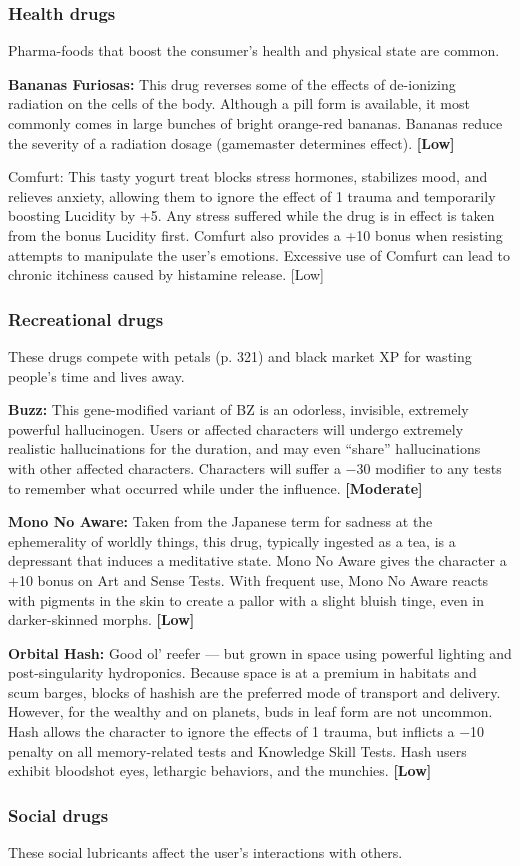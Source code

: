 \subsubsection{Health drugs} 

Pharma-foods that boost the consumer’s health and physical state are common. 

\textbf{Bananas Furiosas:} This drug reverses some of the effects of de-ionizing radiation on the cells of the body. Although a pill form is available, it most commonly comes in large bunches of bright orange-red bananas. Bananas reduce the severity of a radiation dosage (gamemaster determines effect). \textbf{[Low]} 

Comfurt: This tasty yogurt treat blocks stress hormones, stabilizes mood, and relieves anxiety, allowing them to ignore the effect of 1 trauma and temporarily boosting Lucidity by +5. Any stress suffered while the drug is in effect is taken from the bonus Lucidity first. Comfurt also provides a +10 bonus when resisting attempts to manipulate the user’s emotions. Excessive use of Comfurt can lead to chronic itchiness caused by histamine release. [Low] 

\subsubsection{Recreational drugs} 

These drugs compete with petals (p. 321) and black market XP for wasting people’s time and lives away. 

\textbf{Buzz:} This gene-modified variant of BZ is an odorless, invisible, extremely powerful hallucinogen. Users or affected characters will undergo extremely realistic hallucinations for the duration, and may even ``share'' hallucinations with other affected characters. Characters will suffer a $-$30 modifier to any tests to remember what occurred while under the influence. \textbf{[Moderate]} 

\textbf{Mono No Aware:} Taken from the Japanese term for sadness at the ephemerality of worldly things, this drug, typically ingested as a tea, is a depressant that induces a meditative state. Mono No Aware gives the character a +10 bonus on Art and Sense Tests. With frequent use, Mono No Aware reacts with pigments in the skin to create a pallor with a slight bluish tinge, even in darker-skinned morphs. \textbf{[Low]} 

\textbf{Orbital Hash:} Good ol’ reefer --- but grown in space using powerful lighting and post-singularity hydroponics. Because space is at a premium in habitats and scum barges, blocks of hashish are the preferred mode of transport and delivery. However, for the wealthy and on planets, buds in leaf form are not uncommon. Hash allows the character to ignore the effects of 1 trauma, but inflicts a $-$10 penalty on all memory-related tests and Knowledge Skill Tests. Hash users exhibit bloodshot eyes, lethargic behaviors, and the munchies. \textbf{[Low]}\subsubsection{Social drugs}These social lubricants affect the user’s interactions with others. 

